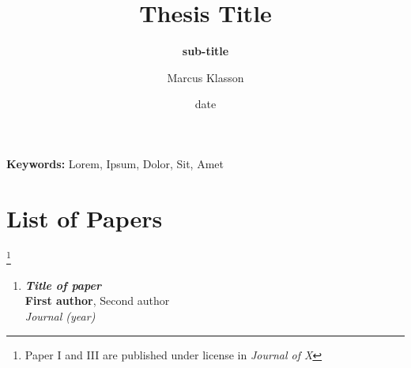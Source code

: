 \documentclass[electronic]{kthesis}
\begin{document}
	
	\title{ Thesis Title }
	\subtitle{\textbf{sub-title}}
	\author{Marcus Klasson}
	\date{date}
	\address{KTH Royal Institute of Technology \\School of Electrical Engineering and Computer Science\\ Division of Fusion Plasma Physics \\ SE-10044 Stockholm\\ Sweden}
	
	\maketitle
	
	\frontmatter %
	\begin{abstract}
		\noindent \lipsum[1]
		
	\end{abstract}
	
	\bigskip \bigskip \bigskip \bigskip \bigskip
	
	\setlength{\leftskip}{0.3 cm} \textbf {Keywords:} Lorem, Ipsum, Dolor, Sit, Amet
	
	\newpage
	\begin{abstract}
		\noindent \lipsum[1]
	\end{abstract}
	
	\chapter{List of Papers}
	
	\let\thefootnote\relax\footnote{Paper I and III are published under license in \textit{Journal of X}}
	\begin{enumerate}[I]
		\item \textbf{\textit{Title of paper}} \\
		\textbf{First author}, Second author \\
		\textit{Journal (year)}
	\end{enumerate}
	
\end{document}

